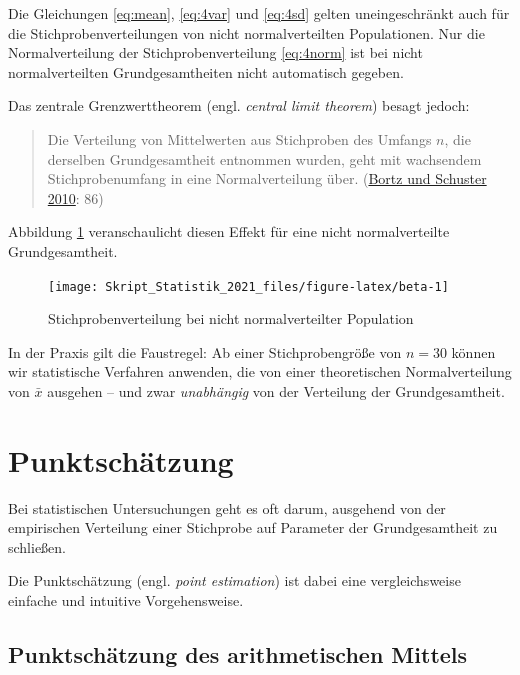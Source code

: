 \documentclass[
  11pt,
  ngerman,
  a4paper,
]{report}
\begin{document}
Die Gleichungen \eqref{eq:mean}, \eqref{eq:4var} und \eqref{eq:4sd} gelten uneingeschränkt auch für die Stichprobenverteilungen von nicht normalverteilten Populationen. Nur die Normalverteilung der Stichprobenverteilung \eqref{eq:4norm} ist bei nicht normalverteilten Grundgesamtheiten nicht automatisch gegeben.

Das zentrale Grenzwerttheorem (engl. \emph{central limit theorem}) besagt jedoch:

\begin{quote}
Die Verteilung von Mittelwerten aus Stichproben des Umfangs \(n\), die derselben Grundgesamtheit entnommen wurden, geht mit wachsendem Stichprobenumfang in eine Normalverteilung über. (\protect\hyperlink{ref-bortz}{Bortz und Schuster 2010}: 86)
\end{quote}

Abbildung \ref{fig:beta} veranschaulicht diesen Effekt für eine nicht normalverteilte Grundgesamtheit.

\begin{figure}[!h]

{\centering \texttt{[image: Skript\_Statistik\_2021\_files/figure-latex/beta-1]} 

}

\caption{Stichprobenverteilung bei nicht normalverteilter Population}\label{fig:beta}
\end{figure}

In der Praxis gilt die Faustregel: Ab einer Stichprobengröße von \(n=30\) können wir statistische Verfahren anwenden, die von einer theoretischen Normalverteilung von \(\bar{x}\) ausgehen -- und zwar \emph{unabhängig} von der Verteilung der Grundgesamtheit.

\hypertarget{punktschuxe4tzung}{%
\section{Punktschätzung}\label{punktschuxe4tzung}}

Bei statistischen Untersuchungen geht es oft darum, ausgehend von der empirischen Verteilung einer Stichprobe auf Parameter der Grundgesamtheit zu schließen.

Die Punktschätzung (engl. \emph{point estimation}) ist dabei eine vergleichsweise einfache und intuitive Vorgehensweise.

\hypertarget{punktschuxe4tzung-des-arithmetischen-mittels}{%
\subsection{Punktschätzung des arithmetischen Mittels}\label{punktschuxe4tzung-des-arithmetischen-mittels}}
\end{document}
